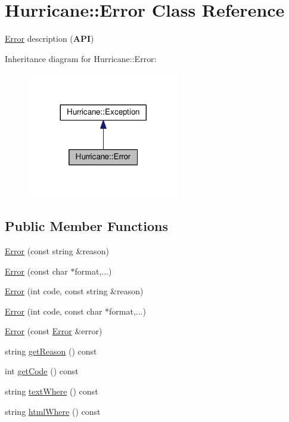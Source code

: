 \hypertarget{classHurricane_1_1Error}{}\section{Hurricane\+:\+:Error Class Reference}
\label{classHurricane_1_1Error}


\hyperlink{classHurricane_1_1Error}{Error} description ({\bfseries A\+PI})  




Inheritance diagram for Hurricane\+:\+:Error\+:\nopagebreak
\begin{figure}[H]
\begin{center}
\leavevmode
\includegraphics[width=188pt]{classHurricane_1_1Error__inherit__graph}
\end{center}
\end{figure}
\subsection*{Public Member Functions}
\begin{DoxyCompactItemize}
\item 
\hyperlink{classHurricane_1_1Error_ab58387c890740ed8082532c5342f2d03}{Error} (const string \&reason)
\item 
\hyperlink{classHurricane_1_1Error_a98f50dcce8258982d450e8f5f79cff38}{Error} (const char $\ast$format,...)
\item 
\hyperlink{classHurricane_1_1Error_a33e4d2a1ea71be6395dc2716b68378c8}{Error} (int code, const string \&reason)
\item 
\hyperlink{classHurricane_1_1Error_a32ccc14fe29d7d2a7b5fe66ee0a3845c}{Error} (int code, const char $\ast$format,...)
\item 
\hyperlink{classHurricane_1_1Error_a7d90d5f5727dab2a9cc0a6427fb2b084}{Error} (const \hyperlink{classHurricane_1_1Error}{Error} \&error)
\item 
string \hyperlink{classHurricane_1_1Error_a1a18927a2d4eb2b0b0acfc2908be7008}{get\+Reason} () const
\item 
int \hyperlink{classHurricane_1_1Error_a1ba11c6ba6eff9fdf2923520fe80a6b2}{get\+Code} () const
\item 
string \hyperlink{classHurricane_1_1Error_ab3b8bb521802f332340eaf0b37eb1dfc}{text\+Where} () const
\item 
string \hyperlink{classHurricane_1_1Error_afafcbeae105f75906c7c45024de41c18}{html\+Where} () const
\end{DoxyCompactItemize}
